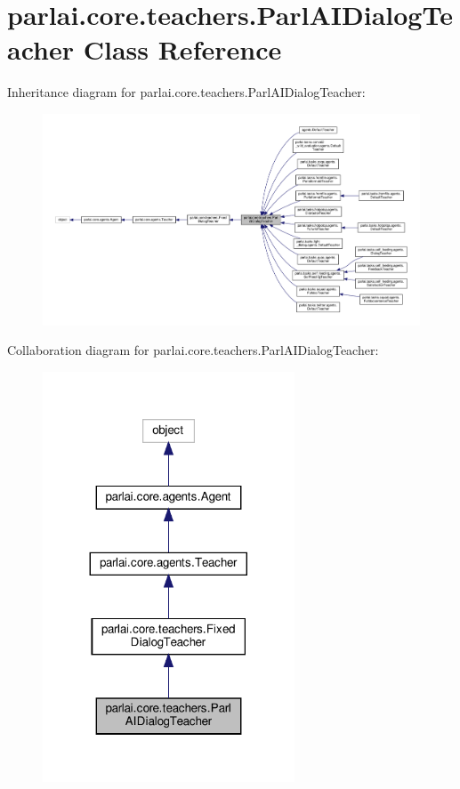 \hypertarget{classparlai_1_1core_1_1teachers_1_1ParlAIDialogTeacher}{}\section{parlai.\+core.\+teachers.\+Parl\+A\+I\+Dialog\+Teacher Class Reference}
\label{classparlai_1_1core_1_1teachers_1_1ParlAIDialogTeacher}


Inheritance diagram for parlai.\+core.\+teachers.\+Parl\+A\+I\+Dialog\+Teacher\+:
\nopagebreak
\begin{figure}[H]
\begin{center}
\leavevmode
\includegraphics[width=350pt]{classparlai_1_1core_1_1teachers_1_1ParlAIDialogTeacher__inherit__graph}
\end{center}
\end{figure}


Collaboration diagram for parlai.\+core.\+teachers.\+Parl\+A\+I\+Dialog\+Teacher\+:
\nopagebreak
\begin{figure}[H]
\begin{center}
\leavevmode
\includegraphics[width=212pt]{classparlai_1_1core_1_1teachers_1_1ParlAIDialogTeacher__coll__graph}
\end{center}
\end{figure}
